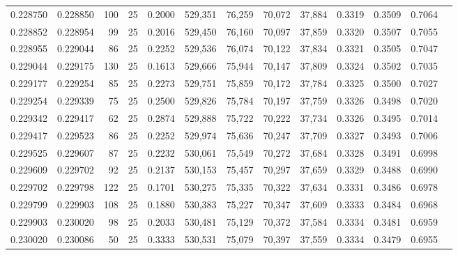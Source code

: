 \begin{tabular}{rrrrrrrrrrrrr}
0.228750 & 0.228850 &   100 &  25 &                                     0.2000 & 529,351 &  76,259 &  70,072 &  37,884 & 0.3319 & 0.3509 & 0.7064 \\
0.228852 & 0.228954 &    99 &  25 &                                     0.2016 & 529,450 &  76,160 &  70,097 &  37,859 & 0.3320 & 0.3507 & 0.7055 \\
0.228955 & 0.229044 &    86 &  25 &                                     0.2252 & 529,536 &  76,074 &  70,122 &  37,834 & 0.3321 & 0.3505 & 0.7047 \\
0.229044 & 0.229175 &   130 &  25 &                                     0.1613 & 529,666 &  75,944 &  70,147 &  37,809 & 0.3324 & 0.3502 & 0.7035 \\
0.229177 & 0.229254 &    85 &  25 &                                     0.2273 & 529,751 &  75,859 &  70,172 &  37,784 & 0.3325 & 0.3500 & 0.7027 \\
0.229254 & 0.229339 &    75 &  25 &                                     0.2500 & 529,826 &  75,784 &  70,197 &  37,759 & 0.3326 & 0.3498 & 0.7020 \\
0.229342 & 0.229417 &    62 &  25 &                                     0.2874 & 529,888 &  75,722 &  70,222 &  37,734 & 0.3326 & 0.3495 & 0.7014 \\
0.229417 & 0.229523 &    86 &  25 &                                     0.2252 & 529,974 &  75,636 &  70,247 &  37,709 & 0.3327 & 0.3493 & 0.7006 \\
0.229525 & 0.229607 &    87 &  25 &                                     0.2232 & 530,061 &  75,549 &  70,272 &  37,684 & 0.3328 & 0.3491 & 0.6998 \\
0.229609 & 0.229702 &    92 &  25 &                                     0.2137 & 530,153 &  75,457 &  70,297 &  37,659 & 0.3329 & 0.3488 & 0.6990 \\
0.229702 & 0.229798 &   122 &  25 &                                     0.1701 & 530,275 &  75,335 &  70,322 &  37,634 & 0.3331 & 0.3486 & 0.6978 \\
0.229799 & 0.229903 &   108 &  25 &                                     0.1880 & 530,383 &  75,227 &  70,347 &  37,609 & 0.3333 & 0.3484 & 0.6968 \\
0.229903 & 0.230020 &    98 &  25 &                                     0.2033 & 530,481 &  75,129 &  70,372 &  37,584 & 0.3334 & 0.3481 & 0.6959 \\
0.230020 & 0.230086 &    50 &  25 &                                     0.3333 & 530,531 &  75,079 &  70,397 &  37,559 & 0.3334 & 0.3479 & 0.6955 \\

\end{tabular}

